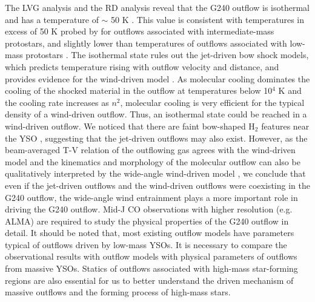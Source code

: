 The LVG analysis and the RD analysis reveal that the G240 outflow is isothermal and has a temperature of $\sim$ 50 K . This value is consistent with temperatures in excess of 50 K probed by \citet{2016A&A...587A..17V} for outflows associated with intermediate-mass protostars, and slightly lower than temperatures of outflows associated with low-mass protostars \citep{2009A&A...501..633V, 2012A&A...542A..86Y}. The isothermal state rules out the jet-driven bow shock models, which predicts temperature rising with outflow velocity and distance, and provides evidence for the wind-driven model \citep{2007prpl.conf..245A}. As molecular cooling dominates the cooling of the shocked material in the outflow at temperatures below 10$^4$ K \citep{1997IAUS..182..181H} and the cooling rate increases as $n^2$, molecular cooling is very efficient for the typical density of a wind-driven outflow. Thus, an isothermal state could be reached in a wind-driven outflow. We noticed that there are faint bow-shaped H$_{2}$ features near the YSO , suggesting that the jet-driven outflows may also exist. However, as the beam-averaged T-V relation of the outflowing gas agrees with the wind-driven model and the kinematics and morphology of the molecular outflow can also be qualitatively interpreted by the wide-angle wind-driven model \citep{2009ApJ...696...66Q}, we conclude that even if the jet-driven outflows and the wind-driven outflows were coexisting in the G240 outflow, the wide-angle wind entrainment plays a more important role in driving the G240 outflow. Mid-J CO observations with higher resolution (e.g. ALMA) are required to study the physical properties of the G240 outflow in detail. It should be noted that, most existing outflow models have parameters typical of outflows driven by low-mass YSOs. It is necessary to compare the observational results with outflow models with physical parameters of outflows from massive YSOs. Statics of outflows associated with high-mass star-forming regions are also essential for us to better understand the driven mechanism of massive outflows and the forming process of high-mass stars.

